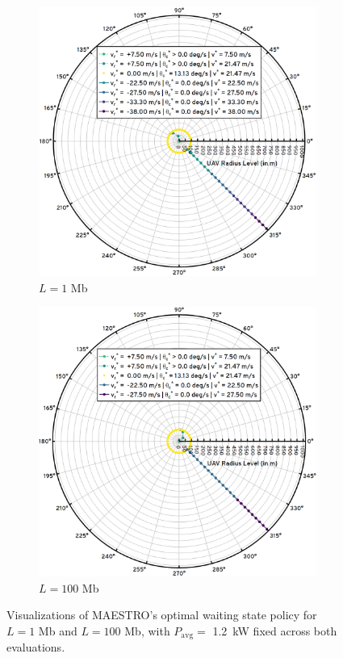 \documentclass[12pt, draftcls, onecolumn]{IEEEtran}
\theoremstyle{plain}
\theoremstyle{definition}
\theoremstyle{remark}
\begin{document}
\begin{figure}[t]
    \begin{subfigure}{0.49\textwidth}
		\centering
		\includegraphics[width=0.9\linewidth]{figs/Wait1.png}
		\caption{$L=1$ Mb}
		\label{F7}
	\end{subfigure}
	\begin{subfigure}{0.49\textwidth}
  		\centering
  		\includegraphics[width=0.9\linewidth]{figs/Wait100.png}
  		\caption{$L=100$ Mb}
  		\label{F8}
	\end{subfigure}
    \caption{Visualizations of MAESTRO's optimal waiting state policy for $L{=}1$ Mb and $L{=}100$ Mb, with $P_{\mathrm{avg}}=$ \qty[mode=text]{1.2}{\kilo\watt} fixed across both evaluations.}
    \vspace{-8mm}
    \label{fig:F7andF8}
\end{figure}
\end{document}
